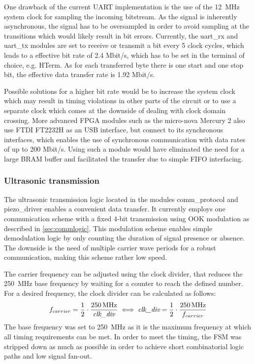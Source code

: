\documentclass[
	english,
	ruledheaders=section, %
	class=report,%
	thesis={type=Project Seminar Report},%
	accentcolor=TUDa-1d, %
	custommargins=false,%
	marginpar=false,%
	parskip=half-,%
	fontsize=11pt,%
]{tudapub}
\newcommand{\inlcode}[1]{\textit{\detokenize{#1}}}
\begin{document}
One drawback of the current \gls{UART} implementation is the use of the \SI{12}{\mega\hertz} system clock for sampling the incoming bitstream. As the signal is inherently asynchronous, the signal has to be oversampled in order to avoid sampling at the transitions which would likely result in bit errors. Currently, the uart\_rx and uart\_tx modules are set to receive or transmit a bit every 5 clock cycles, which leads to a effective bit rate of 2.4 Mbit/s, which has to be set in the terminal of choice, e.g. HTerm. As for each transferred byte there is one start and one stop bit, the effective data transfer rate is 1.92 Mbit/s. 

Possible solutions for a higher bit rate would be to increase the system clock which may result in timing violations in other parts of the circuit or to use a separate clock which comes at the downside of dealing with clock domain crossing. More advanced \gls{FPGA} modules such as the micro-nova Mercury 2 \autocite{micronovaXilinxArtix7FPGA2023} also use FTDI FT2232H as an USB interface, but connect to its synchronous interfaces, which enables the use of synchronous communication with data rates of up to 200 Mbit/s. Using such a module would have eliminated the need for a large \gls{BRAM} buffer and facilitated the transfer due to simple \gls{FIFO} interfacing.

\subsubsection{Ultrasonic transmission}
The ultrasonic transmission logic located in the modules comm\_protocol and piezo\_driver enables a convenient data transfer. It currently employs one communication scheme with a fixed 4-bit transmission using \gls{OOK} modulation as described in \cref{sec:commlogic}. This modulation scheme enables simple demodulation logic by only counting the duration of signal presence or absence. The downside is the need of multiple carrier wave periods for a robust communication, making this scheme rather low speed. 

The carrier frequency can be adjusted using the clock divider, that reduces the \SI{250}{\mega\hertz} base frequency by waiting for a counter to reach the defined number. For a desired frequency, the clock divider can be calculated as follows:
\[f_{carrier} = \frac{1}{2}\cdot\frac{\SI{250}{\mega\hertz}}{\inlcode{clk_div}}   \iff   \inlcode{clk_div} = \frac{1}{2}\cdot\frac{\SI{250}{\mega\hertz}}{f_{carrier}}\]
The base frequency was set to \SI{250}{\mega\hertz} as it is the maximum frequency at which all timing requirements can be met. In order to meet the timing, the \gls{FSM} was stripped down as much as possible in order to achieve short combinatorial logic paths and low signal fan-out.
\end{document}

